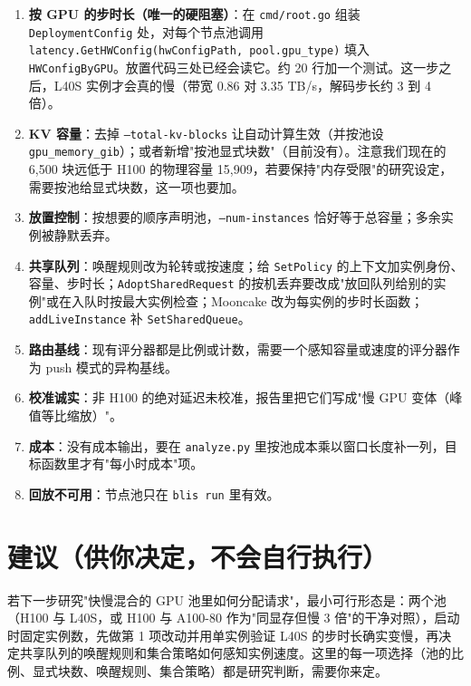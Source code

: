 \documentclass[11pt,a4paper,fontset=windows]{ctexart}
\begin{document}
\begin{enumerate}
\item \textbf{按 GPU 的步时长（唯一的硬阻塞）}：在 \texttt{cmd/root.go} 组装 \texttt{DeploymentConfig} 处，对每个节点池调用 \texttt{latency.GetHWConfig(hwConfigPath, pool.gpu\_type)} 填入 \texttt{HWConfigByGPU}。放置代码三处已经会读它。约 20 行加一个测试。这一步之后，L40S 实例才会真的慢（带宽 0.86 对 3.35 TB/s，解码步长约 3 到 4 倍）。
\item \textbf{KV 容量}：去掉 \texttt{--total-kv-blocks} 让自动计算生效（并按池设 \texttt{gpu\_memory\_gib}）；或者新增"按池显式块数"（目前没有）。注意我们现在的 6,500 块远低于 H100 的物理容量 15,909，若要保持"内存受限"的研究设定，需要按池给显式块数，这一项也要加。
\item \textbf{放置控制}：按想要的顺序声明池，\texttt{--num-instances} 恰好等于总容量；多余实例被静默丢弃。
\item \textbf{共享队列}：唤醒规则改为轮转或按速度；给 \texttt{SetPolicy} 的上下文加实例身份、容量、步时长；\texttt{AdoptSharedRequest} 的按机丢弃要改成"放回队列给别的实例"或在入队时按最大实例检查；Mooncake 改为每实例的步时长函数；\texttt{addLiveInstance} 补 \texttt{SetSharedQueue}。
\item \textbf{路由基线}：现有评分器都是比例或计数，需要一个感知容量或速度的评分器作为 push 模式的异构基线。
\item \textbf{校准诚实}：非 H100 的绝对延迟未校准，报告里把它们写成"慢 GPU 变体（峰值等比缩放）"。
\item \textbf{成本}：没有成本输出，要在 \texttt{analyze.py} 里按池成本乘以窗口长度补一列，目标函数里才有"每小时成本"项。
\item \textbf{回放不可用}：节点池只在 \texttt{blis run} 里有效。
\end{enumerate}

\section{建议（供你决定，不会自行执行）}

若下一步研究"快慢混合的 GPU 池里如何分配请求"，最小可行形态是：两个池（H100 与 L40S，或 H100 与 A100-80 作为"同显存但慢 3 倍"的干净对照），启动时固定实例数，先做第 1 项改动并用单实例验证 L40S 的步时长确实变慢，再决定共享队列的唤醒规则和集合策略如何感知实例速度。这里的每一项选择（池的比例、显式块数、唤醒规则、集合策略）都是研究判断，需要你来定。
\end{document}
